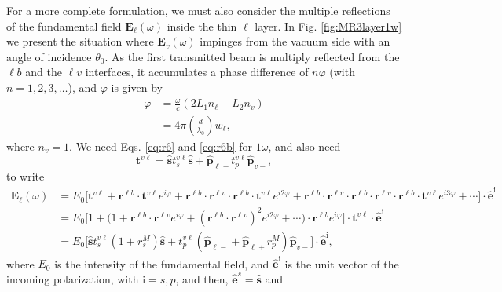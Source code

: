 For a more complete formulation, we must also consider the multiple reflections
of the fundamental field $\mathbf{E}_{\ell}(\omega)$ inside the thin $\ell$
layer. In Fig. \ref{fig:MR3layer1w} we present the situation where
$\mathbf{E}_{v}(\omega)$ impinges from the vacuum side with an angle of
incidence $\theta_{0}$. As the first transmitted beam is multiply reflected from
the $\ell b$ and the $\ell v$ interfaces, it accumulates a phase difference of
$n\varphi$ (with $n=1,2,3,\ldots$), and $\varphi$ is given by
\begin{equation}\label{mphi}
\begin{split}
\varphi &= \frac{\omega}{c}(2L_{1}n_{\ell} - L_{2}n_{v})\\
&= 4\pi\left(\frac{d}{\lambda_{0}}\right)w_{\ell},
\end{split}
\end{equation}
where $n_{v}=1$. We need Eqs. \eqref{eq:r6} and \eqref{eq:r6b} for $1\omega$, and
also need
\begin{equation}\label{eq:mvv}
\mathbf{t}^{v\ell}
= \hat{\mathbf{s}}t_{s}^{v\ell}\hat{\mathbf{s}} 
+ \hat{\mathbf{p}}_{\ell -}t_{p}^{v\ell}\hat{\mathbf{p}}_{v-},
\end{equation}
to write
\begin{align}\label{eq:mcvew}
\mathbf{E}_{\ell}(\omega)
&= E_{0}
\Big[
\mathbf{t}^{v\ell} + \mathbf{r}^{\ell b}\cdot\mathbf{t}^{v\ell}e^{i\varphi}
 + \mathbf{r}^{\ell b}\cdot\mathbf{r}^{\ell v}\cdot
   \mathbf{r}^{\ell b}\cdot\mathbf{t}^{v\ell} e^{i2\varphi}
 + \mathbf{r}^{\ell b}\cdot\mathbf{r}^{\ell v}\cdot
   \mathbf{r}^{\ell b}\cdot\mathbf{r}^{\ell v}\cdot
   \mathbf{r}^{\ell b}\cdot\mathbf{t}^{v\ell} e^{i3\varphi}
 + \cdots
\Big]\cdot\hat{\mathbf{e}}^{\mathrm{i}}\nonumber\\
&= E_{0}
\Big[
1 + \Big(1 + \mathbf{r}^{\ell b}\cdot\mathbf{r}^{\ell v}e^{i\varphi}
+ (\mathbf{r}^{\ell b}\cdot\mathbf{r}^{\ell v})^2e^{i2\varphi}+\cdots\Big)\cdot
\mathbf{r}^{\ell b}e^{i\varphi}
\Big]
\cdot\mathbf{t}^{v\ell}\cdot\hat{\mathbf{e}}^{\mathrm{i}}\nonumber\\
&= E_{0}
\Big[
\hat{\mathbf{s}} t^{v\ell}_{s}(1+r^{M}_{s})\hat{\mathbf{s}} 
+ t^{v\ell}_{p}
\left(\hat{\mathbf{p}}_{\ell-}+\hat{\mathbf{p}}_{\ell+}r^{M}_{p}\right)
\hat{\mathbf{p}}_{v-}
\Big]\cdot\hat{\mathbf{e}}^{\mathrm{i}},
\end{align}
where $E_{0}$ is the intensity of the fundamental field, and
$\hat{\mathbf{e}}^{\mathrm{i}}$ is the unit vector of the incoming polarization,
with $\mathrm{i} = s,p$, and then, $\hat{\mathbf{e}}^{s}=\hat{\mathbf{s}}$ and

